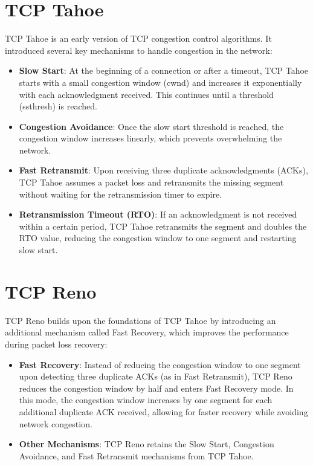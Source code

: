 \section{TCP Tahoe}
TCP Tahoe is an early version of TCP congestion control algorithms. It introduced several key mechanisms to handle congestion in the network:

\begin{itemize}
    \item \textbf{Slow Start}: At the beginning of a connection or after a timeout, TCP Tahoe starts with a small congestion window (cwnd) and increases it exponentially with each acknowledgment received. This continues until a threshold (ssthresh) is reached.
    \item \textbf{Congestion Avoidance}: Once the slow start threshold is reached, the congestion window increases linearly, which prevents overwhelming the network.
    \item \textbf{Fast Retransmit}: Upon receiving three duplicate acknowledgments (ACKs), TCP Tahoe assumes a packet loss and retransmits the missing segment without waiting for the retransmission timer to expire.
    \item \textbf{Retransmission Timeout (RTO)}: If an acknowledgment is not received within a certain period, TCP Tahoe retransmits the segment and doubles the RTO value, reducing the congestion window to one segment and restarting slow start.
\end{itemize}

\section{TCP Reno}
TCP Reno builds upon the foundations of TCP Tahoe by introducing an additional mechanism called Fast Recovery, which improves the performance during packet loss recovery:

\begin{itemize}
    \item \textbf{Fast Recovery}: Instead of reducing the congestion window to one segment upon detecting three duplicate ACKs (as in Fast Retransmit), TCP Reno reduces the congestion window by half and enters Fast Recovery mode. In this mode, the congestion window increases by one segment for each additional duplicate ACK received, allowing for faster recovery while avoiding network congestion.
    \item \textbf{Other Mechanisms}: TCP Reno retains the Slow Start, Congestion Avoidance, and Fast Retransmit mechanisms from TCP Tahoe.
\end{itemize}


